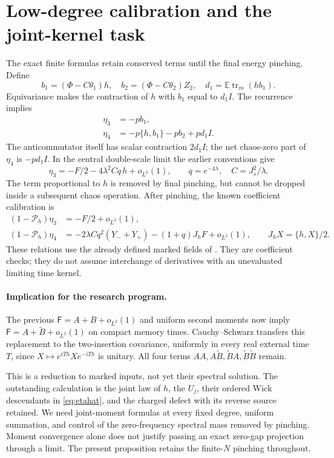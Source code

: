 \documentclass[11pt]{article}
\newcommand{\EE}{\mathbb E}
\newcommand{\tr}{\operatorname{tr}}
\newcommand{\PP}{\mathcal P_h}
\begin{document}
\newpage
\section{Low-degree calibration and the joint-kernel task}
The exact finite formulas retain conserved terms until the final
energy pinching. Define
\begin{equation}
 b_1=(\Phi-C\theta_1)h,\quad b_2=(\Phi-C\theta_2)Z_2,
 \quad d_1=\EE\tr_m(hb_1).
\end{equation}
Equivariance makes the contraction of $h$ with $b_1$ equal to $d_1I$.
The recurrence implies
\begin{align}
 \eta_3&=-pb_1,\\
 \eta_4&=-p\{h,b_1\}-pb_2+pd_1I.\label{eq:eta4}
\end{align}
The anticommutator itself has scalar contraction $2d_1I$;
the net chaos-zero part of $\eta_4$ is $-pd_1I$.
In the central double-scale limit the earlier conventions give
\begin{equation}
 \eta_3=-F/2-4\lambda^2Cq\,h+o_{L^2}(1),\qquad
 q=e^{-4\lambda},\quad C=J_s^2/\lambda.
\end{equation}
The term proportional to $h$ is removed by final pinching, but
cannot be dropped inside a subsequent chaos operation. After pinching,
the known coefficient calibration is
\begin{align}
 (1-\PP)\eta_3&=-F/2+o_{L^2}(1),\\
 (1-\PP)\eta_4&=-2\lambda Cq^2(Y_-+Y_+)
 -(1+q)J_hF+o_{L^2}(1),
 \qquad J_hX=\{h,X\}/2.
\end{align}
These relations use the already defined marked fields of \cite{Two}.
They are coefficient checks; they do not assume interchange of
derivatives with an unevaluated limiting time kernel.

\paragraph{Implication for the research program.}
The previous $\mathsf F=A+B+o_{L^2}(1)$ and uniform second moments
now imply $\mathsf F=A+\widetilde B+o_{L^2}(1)$ on compact memory
times. Cauchy--Schwarz transfers this replacement to the two-insertion
covariance, uniformly in every real external time $T$, since
$X\mapsto e^{iTh}Xe^{-iTh}$ is unitary. All four terms
$AA,A\widetilde B,\widetilde BA,\widetilde B\widetilde B$ remain.

This is a reduction to marked inputs, not yet their spectral solution.
The outstanding calculation is the joint law of $h$, the $U_j$, their
ordered Wick descendants in \eqref{eq:etahat}, and the charged defect
with its reverse source retained. We need joint-moment formulas at every
fixed degree, uniform summation, and control of the zero-frequency
spectral mass removed by pinching. Moment convergence alone does not
justify passing an exact zero-gap projection through a limit.
The present proposition retains the finite-$N$ pinching throughout.
\end{document}
